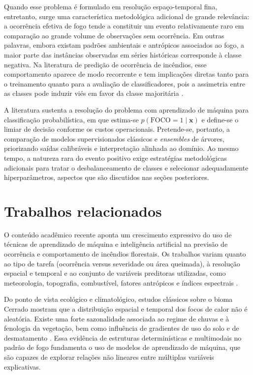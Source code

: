 Quando esse problema é formulado em resolução espaço-temporal fina, entretanto, surge uma característica metodológica adicional de grande relevância: a ocorrência efetiva de fogo tende a constituir um evento relativamente raro em comparação ao grande volume de observações sem ocorrência. Em outras palavras, embora existam padrões ambientais e antrópicos associados ao fogo, a maior parte das instâncias observadas em séries históricas corresponde à classe negativa. Na literatura de predição de ocorrência de incêndios, esse comportamento aparece de modo recorrente e tem implicações diretas tanto para o treinamento quanto para a avaliação de classificadores, pois a assimetria entre as classes pode induzir viés em favor da classe majoritária \cite{phelps2021guidelines,perezporras2021wildfires}.

A literatura sustenta a resolução do problema com aprendizado de máquina para classificação probabilística, em que estima-se $p(\text{FOCO}=1 \mid \mathbf{x})$ e define-se o limiar de decisão conforme os custos operacionais. Pretende-se, portanto, a comparação de modelos supervisionados clássicos e \textit{ensembles} de árvores, priorizando saídas calibráveis e interpretação alinhada ao domínio. Ao mesmo tempo, a natureza rara do evento positivo exige estratégias metodológicas adicionais para tratar o desbalanceamento de classes e selecionar adequadamente hiperparâmetros, aspectos que são discutidos nas seções posteriores.

\section{Trabalhos relacionados}
\label{sec:trabalhos_relacionados}

O conteúdo acadêmico recente aponta um crescimento expressivo do uso de técnicas de aprendizado de máquina e inteligência artificial na previsão de ocorrência e comportamento de incêndios florestais. Os trabalhos variam quanto ao tipo de tarefa (ocorrência versus severidade ou área queimada), à resolução espacial e temporal e ao conjunto de variáveis preditoras utilizadas, como meteorologia, topografia, combustível, fatores antrópicos e índices espectrais \cite{andrianarivony2024review}.

Do ponto de vista ecológico e climatológico, estudos clássicos sobre o bioma Cerrado mostram que a distribuição espacial e temporal dos focos de calor não é aleatória. Existe uma forte sazonalidade associada ao regime de chuvas e à fenologia da vegetação, bem como influência de gradientes de uso do solo e de desmatamento \cite{nascimento2011analise}. Essa evidência de estruturas determinísticas e multimodais no padrão de fogo fundamenta o uso de modelos de aprendizado de máquina, que são capazes de explorar relações não lineares entre múltiplas variáveis explicativas.

